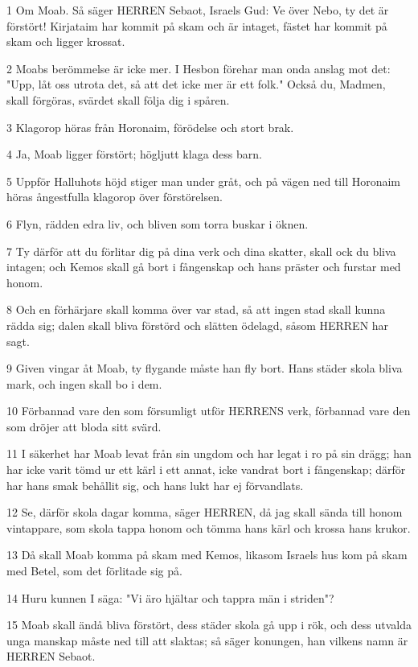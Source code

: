 \par 1 Om Moab. Så säger HERREN Sebaot, Israels Gud: Ve över Nebo, ty det är förstört! Kirjataim har kommit på skam och är intaget, fästet har kommit på skam och ligger krossat.
\par 2 Moabs berömmelse är icke mer. I Hesbon förehar man onda anslag mot det: "Upp, låt oss utrota det, så att det icke mer är ett folk." Också du, Madmen, skall förgöras, svärdet skall följa dig i spåren.
\par 3 Klagorop höras från Horonaim, förödelse och stort brak.
\par 4 Ja, Moab ligger förstört; högljutt klaga dess barn.
\par 5 Uppför Halluhots höjd stiger man under gråt, och på vägen ned till Horonaim höras ångestfulla klagorop över förstörelsen.
\par 6 Flyn, rädden edra liv, och bliven som torra buskar i öknen.
\par 7 Ty därför att du förlitar dig på dina verk och dina skatter, skall ock du bliva intagen; och Kemos skall gå bort i fångenskap och hans präster och furstar med honom.
\par 8 Och en förhärjare skall komma över var stad, så att ingen stad skall kunna rädda sig; dalen skall bliva förstörd och slätten ödelagd, såsom HERREN har sagt.
\par 9 Given vingar åt Moab, ty flygande måste han fly bort. Hans städer skola bliva mark, och ingen skall bo i dem.
\par 10 Förbannad vare den som försumligt utför HERRENS verk, förbannad vare den som dröjer att bloda sitt svärd.
\par 11 I säkerhet har Moab levat från sin ungdom och har legat i ro på sin drägg; han har icke varit tömd ur ett kärl i ett annat, icke vandrat bort i fångenskap; därför har hans smak behållit sig, och hans lukt har ej förvandlats.
\par 12 Se, därför skola dagar komma, säger HERREN, då jag skall sända till honom vintappare, som skola tappa honom och tömma hans kärl och krossa hans krukor.
\par 13 Då skall Moab komma på skam med Kemos, likasom Israels hus kom på skam med Betel, som det förlitade sig på.
\par 14 Huru kunnen I säga: "Vi äro hjältar och tappra män i striden"?
\par 15 Moab skall ändå bliva förstört, dess städer skola gå upp i rök, och dess utvalda unga manskap måste ned till att slaktas; så säger konungen, han vilkens namn är HERREN Sebaot.
